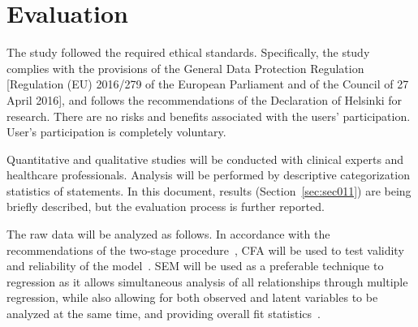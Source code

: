 
\section{Evaluation}
\label{sec:sec006}

The study followed the required ethical standards.
Specifically, the study complies with the provisions of the General Data Protection Regulation [Regulation (EU) 2016/279 of the European Parliament and of the Council of 27 April 2016], and follows the recommendations of the Declaration of Helsinki for research.
There are no risks and benefits associated with the users' participation.
User's participation is completely voluntary.

Quantitative and qualitative studies will be conducted with clinical experts and healthcare professionals.
Analysis will be performed by descriptive categorization statistics of statements.
In this document, results (Section~\ref{sec:sec011}) are being briefly described, but the evaluation process is further reported.

The raw data will be analyzed as follows.
In accordance with the recommendations of the two-stage procedure~\cite{rahi2018investigating}, CFA will be used to test validity and reliability of the model~\cite{crede2019questionable}.
SEM will be used as a preferable technique to regression as it allows simultaneous analysis of all relationships through multiple regression, while also allowing for both observed and latent variables to be analyzed at the same time, and providing overall fit statistics~\cite{hair2017advanced}.

